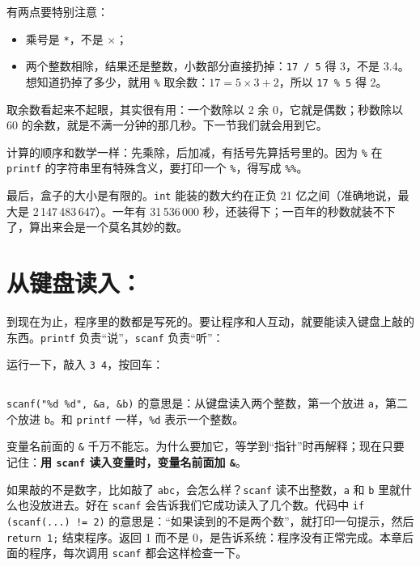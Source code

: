 有两点要特别注意：
\begin{itemize}
  \item 乘号是 \texttt{*}，不是 $\times$；
  \item 两个整数相除，结果还是整数，小数部分直接扔掉：\texttt{17 / 5} 得 3，不是 3.4。想知道扔掉了多少，就用 \texttt{\%} 取余数：$17 = 5 \times 3 + 2$，所以 \texttt{17 \% 5} 得 2。
\end{itemize}

取余数看起来不起眼，其实很有用：一个数除以 2 余 0，它就是偶数；秒数除以 60 的余数，就是不满一分钟的那几秒。下一节我们就会用到它。

计算的顺序和数学一样：先乘除，后加减，有括号先算括号里的。因为 \texttt{\%} 在 \texttt{printf} 的字符串里有特殊含义，要打印一个 \texttt{\%}，得写成 \texttt{\%\%}。

最后，盒子的大小是有限的。\texttt{int} 能装的数大约在正负 21 亿之间（准确地说，最大是 2\,147\,483\,647）。一年有 31\,536\,000 秒，还装得下；一百年的秒数就装不下了，算出来会是一个莫名其妙的数。

\section{从键盘读入：\texorpdfstring{}{scanf}}
\label{sec:scanf}

到现在为止，程序里的数都是写死的。要让程序和人互动，就要能读入键盘上敲的东西。\texttt{printf} 负责“说”，\texttt{scanf} 负责“听”：


运行一下，敲入 \texttt{3 4}，按回车：
\inputminted[linenos=false]{text}{code/ch02/out/add.txt}

\texttt{scanf("\%d \%d", \&a, \&b)} 的意思是：从键盘读入两个整数，第一个放进 \texttt{a}，第二个放进 \texttt{b}。和 \texttt{printf} 一样，\texttt{\%d} 表示一个整数。

变量名前面的 \texttt{\&} 千万不能忘。为什么要加它，等学到“指针”时再解释；现在只要记住：\textbf{用 \texttt{scanf} 读入变量时，变量名前面加 \texttt{\&}}。

如果敲的不是数字，比如敲了 \texttt{abc}，会怎么样？\texttt{scanf} 读不出整数，\texttt{a} 和 \texttt{b} 里就什么也没放进去。好在 \texttt{scanf} 会告诉我们它成功读入了几个数。代码中 \texttt{if (scanf(...) != 2)} 的意思是：“如果读到的不是两个数”，就打印一句提示，然后 \texttt{return 1;} 结束程序。返回 1 而不是 0，是告诉系统：程序没有正常完成。本章后面的程序，每次调用 \texttt{scanf} 都会这样检查一下。

